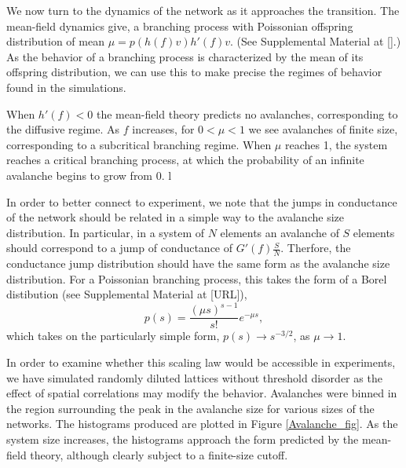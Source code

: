 \documentclass[aps,prl,reprint,groupedaddress]{revtex4-1}
\begin{document}
We now turn to the dynamics of the network as it approaches the
transition. The mean-field dynamics give, a
branching process with Poissonian offspring distribution of mean
$\mu = p(h(f)v)h'(f)v$. (See Supplemental Material at [].)  As the behavior of a
branching process is characterized by the mean of its offspring distribution,
we can use this to make precise the regimes of behavior found in the simulations.

When $h'(f)<0$ the mean-field theory predicts no avalanches, corresponding
to the diffusive
regime.  As $f$ increases, for $0<\mu < 1$ we see avalanches of finite
size, corresponding to a subcritical branching regime.  When $\mu$ reaches 1,
the system reaches a critical branching process, at which the probability of
an infinite avalanche begins to grow from 0.
l%

In order to better connect to
experiment, we note that the jumps in conductance of the network should be 
related in a simple way to the avalanche size distribution.  In particular, in a system
of $N$ elements
an avalanche of $S$ elements should correspond to a jump of conductance of
$G'(f)\frac{S}{N}$.  Therfore, the conductance jump distribution should have the
same form as the avalanche size distribution. For a Poissonian branching
process, this takes the form of a Borel distibution
(see Supplemental Material at [URL]),
\begin{equation}
p(s) = \frac{(\mu s)^{s-1}}{s!}e^{-\mu s},
\end{equation}
which takes on the particularly simple form, $p(s) \to s^{-3/2}$, 
as $\mu\to 1$.

In order to examine whether this scaling law would be accessible in experiments, we have 
simulated randomly diluted lattices without threshold disorder as the
effect of spatial correlations may modify the behavior.  Avalanches were
binned in the region surrounding the peak in the avalanche size for
various sizes of the networks. The histograms produced are plotted in
Figure \ref{Avalanche_fig}. As the system size increases, the histograms approach
the form predicted by the mean-field theory, although clearly subject to a finite-size
cutoff.
\end{document}
